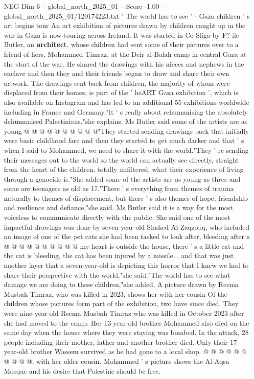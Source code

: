 \begin{textsample}{NEG Dim 6 – global\_north\_2025\_01 – Score -1.00 – global\_north\_2025\_01/120174223.txt}  \label{ex:f6_neg_099}
' The world has to see ' - Gaza children ' s art begins tour An art exhibition of pictures drawn by children caught up in the war in Gaza is now touring across Ireland.
It was started in Co Sligo by F? ile Butler, an \textbf{architect}, whose children had sent some of their pictures over to a friend of hers, Mohammed Timraz, at the Deir al-Balah camp in central Gaza at the start of the war.
He shared the drawings with his nieces and nephews in the enclave and then they and their friends began to draw and share their own artwork.
The drawings sent back from children, the majority of whom were displaced from their homes, is part of the ' heART Gaza exhibition ', which is also available on Instagram and has led to an additional 55 exhibitions worldwide including in France and Germany."It ' s really about rehumanising the absolutely dehumanised Palestinians,"she explains.
Ms Butler said some of the artists are as young @ @ @ @ @ @ @ @ @ @"They started sending drawings back that initially were basic childhood fare and then they started to get much darker and that ' s when I said to Mohammed, we need to share it with the world."They ' re sending their messages out to the world so the world can actually see directly, straight from the heart of the children, totally unfiltered, what their experience of living through a genocide is."She added some of the artists are as young as three and some are teenagers as old as 17."There ' s everything from themes of trauma naturally to themes of displacement, but there ' s also themes of hope, friendship and resilience and defiance,"she said.
Ms Butler said it is a way for the most voiceless to communicate directly with the public.
She said one of the most impactful drawings was done by seven-year-old Shahed Al-Zaqzouq, who included an image of one of the pet cats she had been tasked to look after, bleeding after a @ @ @ @ @ @ @ @ @ @ my heart is outside the house, there ' s a little cat and the cat is bleeding, the cat has been injured by a missile... and that was just another layer that a seven-year-old is depicting this horror that I knew we had to share their perspective with the world,"she said."The world has to see what damage we are doing to these children,"she added.
A picture drawn by Reema Musbah Timraz, who was killed in 2023, shows her with her cousin Of the children whose pictures form part of the exhibition, two have since died.
They were nine-year-old Reema Musbah Timraz who was killed in October 2023 after she had moved to the camp.
Her 13-year-old brother Mohammed also died on the same day when the house where they were staying was bombed.
In the attack, 28 people including their mother, father and another brother died.
Only their 17-year-old brother Wassem survived as he had gone to a local shop. @ @ @ @ @ @ @ @ @ @, with her older cousin.
Mohammed ' s picture shows the Al-Aqsa Mosque and his desire that Palestine should be free.

\end{textsample}
